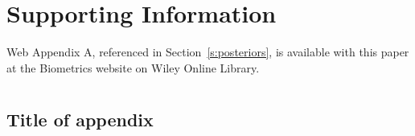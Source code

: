 \documentclass[useAMS,referee,usenatbib]{biom}
\begin{document}
  





\section*{Supporting Information}

Web Appendix A, referenced in Section~\ref{s:posteriors}, is available with
this paper at the Biometrics website on Wiley Online
Library.\vspace*{-8pt}

\appendix


\section{}
\subsection{Title of appendix}


\label{lastpage}
\end{document}
